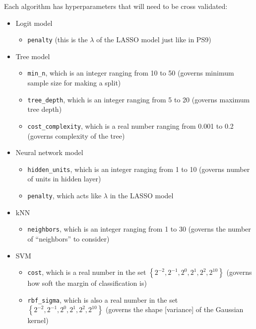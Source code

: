 \documentclass[12pt,english]{exam}
\begin{document}
\begin{questions}
\question Each algorithm has hyperparameters that will need to be cross validated:
\begin{itemize}
\item Logit model 
    \begin{itemize}
    \item \texttt{penalty} (this is the $\lambda$ of the LASSO model just like in PS9)
    \end{itemize}
\item Tree model
    \begin{itemize}
    \item \texttt{min\_n}, which is an integer ranging from 10 to 50 (governs minimum sample size for making a split)
    \item \texttt{tree\_depth}, which is an integer ranging from 5 to 20 (governs maximum tree depth)
    \item \texttt{cost\_complexity}, which is a real number ranging from 0.001 to 0.2 (governs complexity of the tree)
    \end{itemize}
\item Neural network model
    \begin{itemize}
    \item \texttt{hidden\_units}, which is an integer ranging from 1 to 10 (governs number of units in hidden layer)
    \item \texttt{penalty}, which acts like $\lambda$ in the LASSO model
    \end{itemize}
\item kNN
    \begin{itemize}
    \item \texttt{neighbors}, which is an integer ranging from 1 to 30 (governs the number of ``neighbors'' to consider)
    \end{itemize}
\item SVM
    \begin{itemize}
    \item \texttt{cost}, which is a real number in the set $\left\{2^{-2},2^{-1},2^{0},2^{1},2^{2},2^{10}\right\}$ (governs how soft the margin of classification is)
    \item \texttt{rbf\_sigma}, which is also a real number in the set $\left\{2^{-2},2^{-1},2^{0},2^{1},2^{2},2^{10}\right\}$ (governs the shape [variance] of the Gaussian kernel) 
    \end{itemize}
\end{itemize}


\end{questions}
\end{document}
